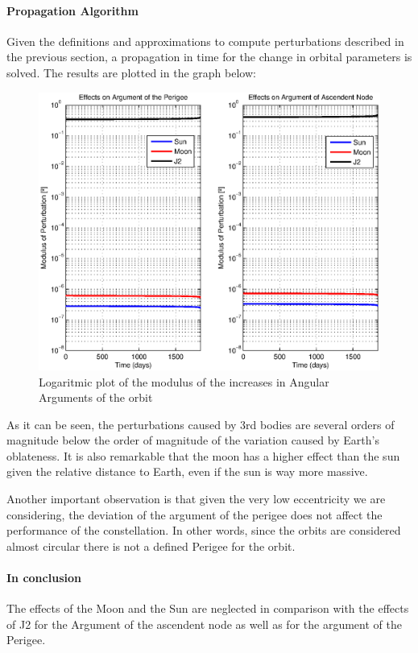 \paragraph{Propagation Algorithm\\}
Given the definitions and approximations to compute perturbations described in the previous section, a propagation in time for the change in orbital parameters is solved. The results are plotted in the graph below:

\begin{figure}[H]
\centering
\includegraphics[scale=0.7]{SignificativePerturbations/ModulusAngulars.eps}
\caption{Logaritmic plot of the modulus of the increases in Angular Arguments of the orbit}
\end{figure}

As it can be seen, the perturbations caused by 3rd bodies are several orders of magnitude below the order of magnitude of the variation caused by Earth's oblateness. It is also remarkable that the moon has a higher effect than the sun given the relative distance to Earth, even if the sun is way more massive.

Another important observation is that given the very low eccentricity we are considering, the deviation of the argument of the perigee does not affect the performance of the constellation. In other words, since the orbits are considered almost circular there is not a defined Perigee for the orbit.

\paragraph{In conclusion\\}
The effects of the Moon and the Sun are neglected in comparison with the effects of J2 for the Argument of the ascendent node as well as for the argument of the Perigee.